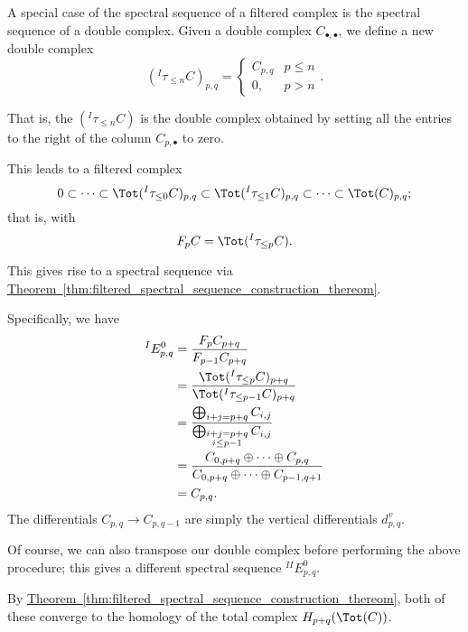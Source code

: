 \documentclass[main.tex]{subfiles}
\begin{document}
A special case of the spectral sequence of a filtered complex is the spectral sequence of a double complex. Given a double complex $C_{\bullet,\bullet}$, we define a new double complex
\begin{equation*}
  \left(^{I}\tau_{\leq n}C\right)_{p,q} =
  \begin{cases}
    C_{p,q} & p \leq n \\
    0, & p > n
  \end{cases}.
\end{equation*}

That is, the $\left(^{I}\tau_{\leq n}C\right)$ is the double complex obtained by setting all the entries to the right of the column $C_{p, \bullet}$ to zero.

This leads to a filtered complex
\begin{equation*}
  0 \subset \cdots \subset \Tot(^{I}\tau_{\leq 0}C)_{p, q} \subset \Tot(^{I}\tau_{\leq 1}C)_{p, q} \subset \cdots \subset \Tot(C)_{p,q};
\end{equation*}
that is, with
\begin{equation*}
  F_{p}C = \Tot(^{I}\tau_{\leq p}C).
\end{equation*}

This gives rise to a spectral sequence via \hyperref[thm:filtered_spectral_sequence_construction_thereom]{Theorem~\ref*{thm:filtered_spectral_sequence_construction_thereom}}.

Specifically, we have
\begin{align*}
  ^{I}E^{0}_{p,q} &= \frac{F_{p}C_{p+q}}{F_{p-1}C_{p+q}} \\
  &= \frac{\Tot(^{I}\tau_{\leq p}C)_{p+q}}{\Tot(^{I}\tau_{\leq p-1}C)_{p+q}} \\
  &= \frac{\bigoplus_{\substack{i+j = p+q}} C_{i,j}}{\bigoplus_{\substack{i + j = p+q \\ i \leq p-1}}C_{i,j}} \\
  &= \frac{C_{0,p+q} \oplus \cdots \oplus C_{p, q}}{C_{0,p+q} \oplus \cdots \oplus C_{p-1, q+1}} \\
  &= C_{p, q}.
\end{align*}
The differentials $C_{p, q} \to C_{p, q-1}$ are simply the vertical differentials $d^{v}_{p,q}$.

Of course, we can also transpose our double complex before performing the above procedure; this gives a different spectral sequence $^{II}E^{0}_{p,q}$.

By \hyperref[thm:filtered_spectral_sequence_construction_thereom]{Theorem~\ref*{thm:filtered_spectral_sequence_construction_thereom}}, both of these converge to the homology of the total complex $H_{p+q}(\Tot(C))$.
\end{document}
